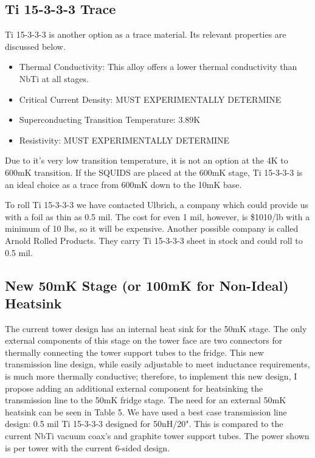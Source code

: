 \documentclass{report}
\begin{document}
\begin{multicols}{2}
\subsection{Ti 15-3-3-3 Trace}
Ti 15-3-3-3 is another option as a trace material. Its relevant properties are discussed below.
\begin{itemize}
\item Thermal Conductivity: This alloy offers a lower thermal conductivity than NbTi at all stages.
\item Critical Current Density: MUST EXPERIMENTALLY DETERMINE
\item Superconducting Transition Temperature: 3.89K
\item Resistivity: MUST EXPERIMENTALLY DETERMINE
\end{itemize}

Due to it's very low transition temperature, it is not an option at the 4K to 600mK transition. If the SQUIDS are placed at the 600mK stage, Ti 15-3-3-3 is an ideal choice as a trace from 600mK down to the 10mK base.

To roll Ti 15-3-3-3 we have contacted Ulbrich, a company which could provide us with a foil as thin as 0.5 mil. The cost for even 1 mil, however, is \$1010/lb with a minimum of 10 lbs, so it will be expensive. Another possible company is called Arnold Rolled Products. They carry Ti 15-3-3-3 sheet in stock and could roll to 0.5 mil.

\bigskip

\subsection{New 50mK Stage (or 100mK for Non-Ideal) Heatsink}
 The current tower design has an internal heat sink for the 50mK stage. The only external components of this stage on the tower face are two connectors for thermally connecting
the tower support tubes to the fridge. This new transmission line design, while easily adjustable to meet inductance requirements, is much more thermally conductive; therefore,
to implement this new design, I propose adding an additional external component for heatsinking the transmission line to the 50mK fridge stage. The need for an external 50mK
heatsink can be seen in Table 5. We have used a best case transmission line design: 0.5 mil Ti 15-3-3-3 designed for 50nH/20". This is compared to the current NbTi vacuum coax's and graphite tower support tubes. The power shown is per tower with the current 6-sided design.


\end{multicols}
\end{document}
